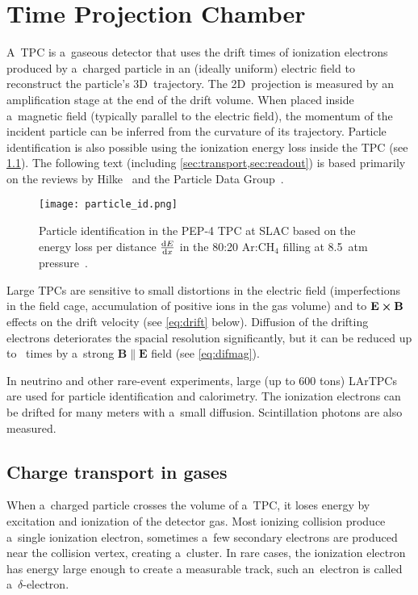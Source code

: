 \chapter{Time Projection Chamber}
\label{sec:tpc}
	A~\acf{TPC} is a~gaseous detector that uses the drift times of ionization electrons produced by a~charged particle in an (ideally uniform) electric field to reconstruct the particle's 3D~trajectory. The 2D~projection is measured by an amplification stage at the end of the drift volume. When placed inside a~magnetic field (typically parallel to the electric field), the momentum of the incident particle can be inferred from the curvature of its trajectory. Particle identification is also possible using the ionization energy loss inside the \ac{TPC} (see \cref{fig:particleid}). The following text (including \cref{sec:transport,sec:readout}) is based primarily on the reviews by Hilke~\cite{TPCs} and the Particle Data Group~\cite{pdg2024}.
	
	\begin{figure}[H]
		\centering
		\texttt{[image: particle\_id.png]}
		\caption{Particle identification in the PEP-4 \ac{TPC} at SLAC based on the energy loss per distance $\dv{E}{x}$ in the 80:20 Ar:CH$_4$ filling at \qty{8.5}{atm} pressure~\cite{particleid}.}
		\label{fig:particleid}
	\end{figure}
	
	Large \acp{TPC} are sensitive to small distortions in the electric field (imperfections in the field cage, accumulation of positive ions in the gas volume) and to $\mathbf{E}\cross\mathbf{B}$ effects on the drift velocity (see \cref{eq:drift} below). Diffusion of the drifting electrons deteriorates the spacial resolution significantly, but it can be reduced up to ~times by a~strong $\mathbf{B}\parallel\mathbf{E}$ field (see \cref{eq:difmag}).
	
	In neutrino and other rare-event experiments, large (up to 600 tons) \acp{LArTPC} are used for particle identification and calorimetry. The ionization electrons can be drifted for many meters with a~small diffusion. Scintillation photons are also measured.
	
	\section{Charge transport in gases}
	\label{sec:transport}
		When a~charged particle crosses the volume of a~\ac{TPC}, it loses energy by excitation and ionization of the detector gas. Most ionizing collision produce a~single ionization electron, sometimes a~few secondary electrons are produced near the collision vertex, creating a~cluster. In rare cases, the ionization electron has energy large enough to create a measurable track, such an~electron is called a~$\delta$\nobreakdash-electron.
		
